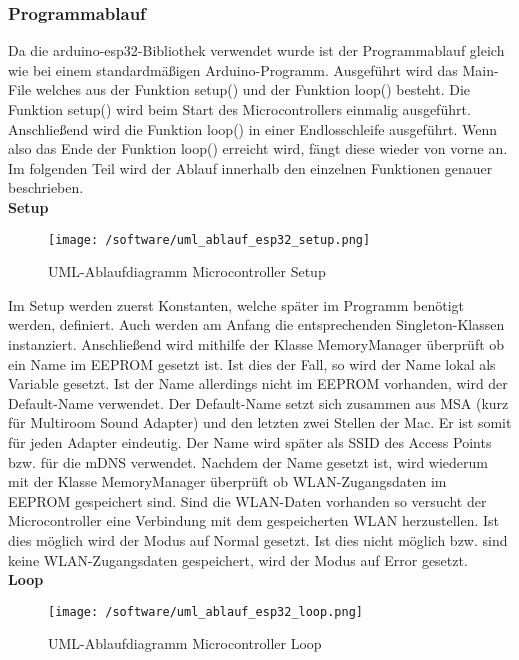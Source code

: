 \documentclass[]{article}
\begin{document}
\subsubsection{Programmablauf}
Da die arduino-esp32-Bibliothek verwendet wurde ist der Programmablauf gleich wie bei einem standardmäßigen Arduino-Programm. Ausgeführt wird das Main-File welches aus der Funktion setup() und der Funktion loop() besteht. Die Funktion setup() wird beim Start des Microcontrollers einmalig ausgeführt. Anschließend wird die Funktion loop() in einer Endlosschleife ausgeführt. Wenn also das Ende der Funktion loop() erreicht wird, fängt diese wieder von vorne an. Im folgenden Teil wird der Ablauf innerhalb den einzelnen Funktionen genauer beschrieben. \newline \\
\textbf{Setup} \\
\begin{figure}[H]
\texttt{[image: /software/uml\_ablauf\_esp32\_setup.png]}
\caption{UML-Ablaufdiagramm Microcontroller Setup}
\end{figure}
Im Setup werden zuerst Konstanten, welche später im Programm benötigt werden, definiert. Auch werden am Anfang die entsprechenden Singleton-Klassen instanziert. Anschließend wird mithilfe der Klasse MemoryManager überprüft ob ein Name im EEPROM gesetzt ist. Ist dies der Fall, so wird der Name lokal als Variable gesetzt. Ist der Name allerdings nicht im EEPROM vorhanden, wird der Default-Name verwendet. Der Default-Name setzt sich zusammen aus MSA (kurz für Multiroom Sound Adapter) und den letzten zwei Stellen der Mac. Er ist somit für jeden Adapter eindeutig. Der Name wird später als SSID des Access Points bzw. für die mDNS verwendet. Nachdem der Name gesetzt ist, wird wiederum mit der Klasse MemoryManager überprüft ob WLAN-Zugangsdaten im EEPROM gespeichert sind. Sind die WLAN-Daten vorhanden so versucht der Microcontroller eine Verbindung mit dem gespeicherten WLAN herzustellen. Ist dies möglich wird der Modus auf Normal gesetzt. Ist dies nicht möglich bzw. sind keine WLAN-Zugangsdaten gespeichert, wird der Modus auf Error gesetzt. \newline \\
\textbf{Loop} \\
\begin{figure}[H]
\texttt{[image: /software/uml\_ablauf\_esp32\_loop.png]}
\caption{UML-Ablaufdiagramm Microcontroller Loop}
\end{figure}
\end{document}
